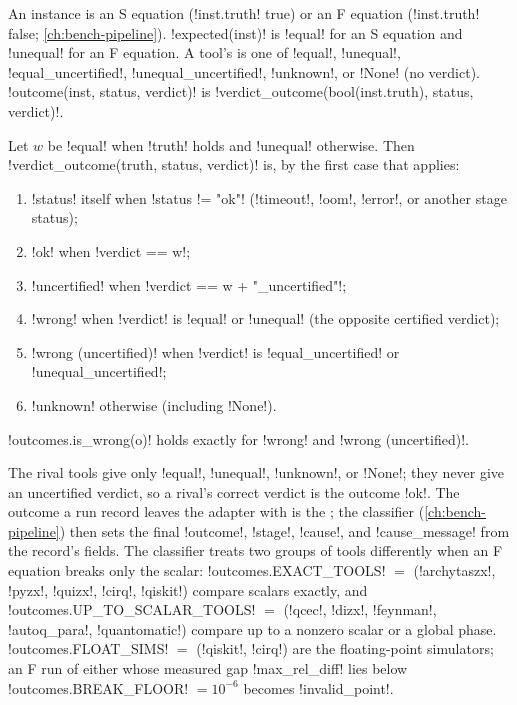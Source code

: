 An instance is an S equation (\py!inst.truth! true) or an F equation (\py!inst.truth! false; \cref{ch:bench-pipeline}). \py!expected(inst)! is \code!equal! for an S equation and \code!unequal! for an F equation. A tool's  is one of \code!equal!, \code!unequal!, \code!equal_uncertified!, \code!unequal_uncertified!, \code!unknown!, or \py!None! (no verdict). \py!outcome(inst, status, verdict)! is \py!verdict_outcome(bool(inst.truth), status, verdict)!.

\begin{definition}\label{def:bench-tools-outcome}
Let $w$ be \code!equal! when \py!truth! holds and \code!unequal! otherwise. Then \py!verdict_outcome(truth, status, verdict)! is, by the first case that applies:
\begin{enumerate}
\item \py!status! itself when \py!status != "ok"! (\code!timeout!, \code!oom!, \code!error!, or another stage status);
\item \code!ok! when \py!verdict == w!;
\item \code!uncertified! when \py!verdict == w + "_uncertified"!;
\item \code!wrong! when \py!verdict! is \code!equal! or \code!unequal! (the opposite certified verdict);
\item \code!wrong (uncertified)! when \py!verdict! is \code!equal_uncertified! or \code!unequal_uncertified!;
\item \code!unknown! otherwise (including \py!None!).
\end{enumerate}
\py!outcomes.is_wrong(o)! holds exactly for \code!wrong! and \code!wrong (uncertified)!.
\end{definition}

The rival tools give only \code!equal!, \code!unequal!, \code!unknown!, or \py!None!; they never give an uncertified verdict, so a rival's correct verdict is the outcome \code!ok!. The outcome a run record leaves the adapter with is the ; the classifier (\cref{ch:bench-pipeline}) then sets the final \code!outcome!, \code!stage!, \code!cause!, and \code!cause_message! from the record's fields. The classifier treats two groups of tools differently when an F equation breaks only the scalar: \py!outcomes.EXACT_TOOLS! $=$ (\code!archytaszx!, \code!pyzx!, \code!quizx!, \code!cirq!, \code!qiskit!) compare scalars exactly, and \py!outcomes.UP_TO_SCALAR_TOOLS! $=$ (\code!qcec!, \code!dizx!, \code!feynman!, \code!autoq_para!, \code!quantomatic!) compare up to a nonzero scalar or a global phase. \py!outcomes.FLOAT_SIMS! $=$ (\code!qiskit!, \code!cirq!) are the floating-point simulators; an F run of either whose measured gap \code!max_rel_diff! lies below \py!outcomes.BREAK_FLOOR! $=10^{-6}$ becomes \code!invalid_point!.

